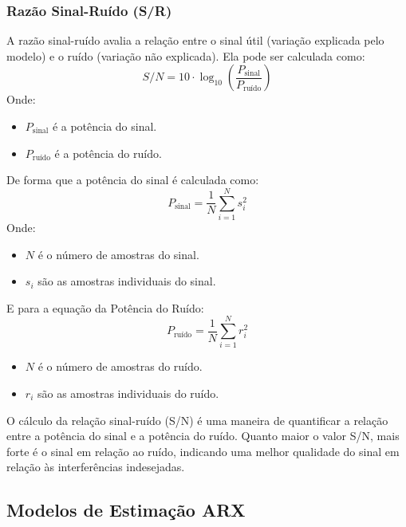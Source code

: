\documentclass[a4paper,12pt]{article}
\begin{document}
\subsubsection{Razão Sinal-Ruído (S/R)}

A razão sinal-ruído avalia a relação entre o sinal útil (variação explicada pelo modelo) e o ruído (variação não explicada). Ela pode ser calculada como:
\begin{equation}
    S/N = 10 \cdot \log_{10}\left(\frac{P_{\text{sinal}}}{P_{\text{ruído}}}\right)\tag{2.10.2.2}
\end{equation}
Onde:
\begin{itemize}
    \item \(P_{\text{sinal}}\) é a potência do sinal.
    \item \(P_{\text{ruído}}\) é a potência do ruído.
\end{itemize}
De forma que a potência do sinal é calculada como:
\begin{equation}
    P_{\text{sinal}} = \frac{1}{N} \sum_{i=1}^{N} s_i^2\tag{2.10.2.3}
\end{equation}
Onde:
\begin{itemize}
    \item \(N\) é o número de amostras do sinal.
    \item \(s_i\) são as amostras individuais do sinal.
\end{itemize}
E para a equação da Potência do Ruído:
\begin{equation}
    P_{\text{ruído}} = \frac{1}{N} \sum_{i=1}^{N} r_i^2\tag{2.10.2.4}
\end{equation}
\begin{itemize}
    \item \(N\) é o número de amostras do ruído.
    \item \(r_i\) são as amostras individuais do ruído.
\end{itemize}

O cálculo da relação sinal-ruído (S/N) é uma maneira de quantificar a relação entre a potência do sinal e a potência do ruído. Quanto maior o valor S/N, mais forte é o sinal em relação ao ruído, indicando uma melhor qualidade do sinal em relação às interferências indesejadas.

\subsection{Modelos de Estimação ARX}
\end{document}

